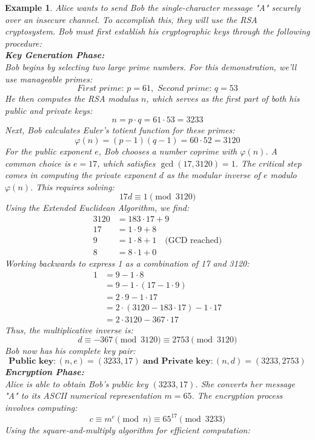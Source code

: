 \documentclass[11pt,a4paper]{article}
\newtheorem{example}{Example}
\numberwithin{equation}{section}
\begin{document}
\begin{example}
\label{ex:alice-bob-rsa}
Alice wants to send Bob the single-character message "A" securely over an insecure channel. To accomplish this, they will use the RSA cryptosystem. Bob must first establish his cryptographic keys through the following procedure: \\
\textbf{Key Generation Phase:} \\
Bob begins by selecting two large prime numbers. For this demonstration, we'll use manageable primes:
\[ \textit{First prime: } p = 61, \textit{ Second prime: } q = 53 \]
He then computes the RSA modulus $n$, which serves as the first part of both his public and private keys:
\[n = p \cdot q = 61 \cdot 53 = 3233\]
Next, Bob calculates Euler's totient function for these primes:
\[\varphi(n) = (p-1)(q-1) = 60 \cdot 52 = 3120\]
For the public exponent $e$, Bob chooses a number coprime with $\varphi(n)$. A common choice is $e = 17$, which satisfies $\gcd(17, 3120) = 1$. The critical step comes in computing the private exponent $d$ as the modular inverse of $e$ modulo $\varphi(n)$. This requires solving:
\[17d \equiv 1 \pmod{3120}\]
Using the Extended Euclidean Algorithm, we find:
\begin{align*}
3120 &= 183 \cdot 17 + 9 \\
17 &= 1 \cdot 9 + 8 \\
9 &= 1 \cdot 8 + \boxed{1} \quad \text{(GCD reached)} \\
8 &= 8 \cdot 1 + 0
\end{align*}
Working backwards to express 1 as a combination of 17 and 3120:
\begin{align*}
1 &= 9 - 1 \cdot 8 \\
  &= 9 - 1 \cdot (17 - 1 \cdot 9) \\
  &= 2 \cdot 9 - 1 \cdot 17 \\
  &= 2 \cdot (3120 - 183 \cdot 17) - 1 \cdot 17 \\
  &= 2 \cdot 3120 - 367 \cdot 17
\end{align*}
Thus, the multiplicative inverse is:
\[d \equiv -367 \pmod{3120} \equiv 2753 \pmod{3120}\]
Bob now has his complete key pair:
\[ \textbf{Public key}: (n, e) = (3233, 17) \textbf{ and Private key}: (n, d) = (3233, 2753) \]
\textbf{Encryption Phase:} \\
Alice is able to obtain Bob's public key $(3233, 17)$. She converts her message "A" to its ASCII numerical representation $m = 65$. The encryption process involves computing:
\[c \equiv m^e \pmod{n} \equiv 65^{17} \pmod{3233}\]
Using the square-and-multiply algorithm for efficient computation:

\end{example}
\end{document}
